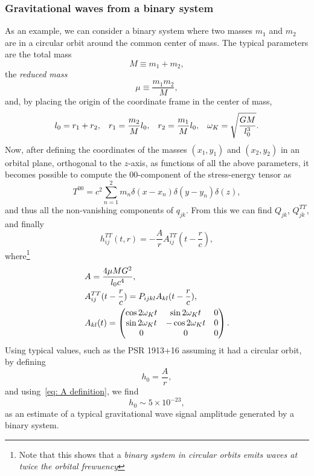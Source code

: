 \subsubsection{Gravitational waves from a binary system}
As an example, we can consider a binary system where two masses $m_1$ and $m_2$ are in a circular orbit around the common center of mass.
The typical parameters are the total mass
\[
    M\equiv m_1+m_2,
\]
the \textit{reduced mass}
\[
    \mu\equiv \frac{m_1m_2}{M},
\]
and, by placing the origin of the coordinate frame in the center of mass, 
\[
    l_0 = r_1+r_2, \hspace{3mm} r_1=\frac{m_2}{M}l_0, \hspace{3mm} r_2=\frac{m_1}{M}l_0, \hspace{3mm} \omega_K=\sqrt{ \frac{GM}{l_0^3}}.
\]
Now, after defining the coordinates of the masses $(x_1,y_1)$ and $(x_2,y_2)$ in an orbital plane, orthogonal to the $z$-axis, as functions of all the above parameters, it becomes possible to compute the 00-component of the stress-energy tensor as
\[
T^{00}=c^2\sum^2_{n=1}m_n\delta(x-x_n)\delta(y-y_n)\delta(z),
\]
and thus all the non-vanishing components of $q_{jk}$.
From this we can find $Q_{jk}$, $Q_{jk}^{TT}$, and finally
\begin{equation}
    h_{ij}^{TT}(t,r) = -\frac{A}{r}A_{ij}^{TT}(t-\frac{r}{c}),
    \label{eq: binary system general strain solution}
\end{equation}
where\footnote{Note that this shows that a \textit{binary system in circular orbits emits waves at twice the orbital frewuency}} 
\begin{align}
    & A=\frac{4\mu MG^2}{l_0c^4}, \notag\\
    & A_{ij}^{TT}(t-\frac{r}{c}) = P_{ijkl}A_{kl}(t-\frac{r}{c}),\notag\\ 
    \vspace{2mm}
    &    A_{kl}(t) =  
    \begin{pmatrix}
        \cos{2\omega_Kt} & \sin{2\omega_Kt} & 0 \\
     \sin{2\omega_Kt} &  -\cos{2\omega_Kt}& 0 \\
     0 & 0 & 0 \\
    \end{pmatrix}.
    \label{eq: A definition}
\end{align}
Using typical values, such as the PSR 1913+16 assuming it had a circular orbit, by defining 
\[
    h_0=\frac{A}{r},
\]
and using~\eqref{eq: A definition}, we find  
\begin{equation}
    h_0\sim 5\times10^{-23}, 
    \label{eq: typical strain amplitude value}
\end{equation}
as an estimate of a typical gravitational wave signal amplitude generated by a binary system.


